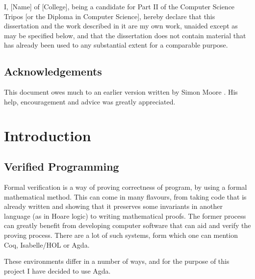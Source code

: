 \documentclass[12pt,twoside,notitlepage]{report}
\begin{document}
I, [Name] of [College], being a candidate for Part II of the Computer
Science Tripos [or the Diploma in Computer Science], hereby declare
that this dissertation and the work described in it are my own work,
unaided except as may be specified below, and that the dissertation
does not contain material that has already been used to any substantial
extent for a comparable purpose.

\bigskip
{}

\medskip
{}

\cleardoublepage

\tableofcontents

\listoffigures

\newpage
\section*{Acknowledgements}

This document owes much to an earlier version written by Simon Moore
\cite{moore95}.  His help, encouragement and advice was greatly
appreciated.


\cleardoublepage        %

\setcounter{page}{1}
\pagestyle{headings}

\chapter{Introduction}

\section{Verified Programming}

Formal verification is a way of proving correctness of program, by using a formal mathematical method. This can come in many flavours, from taking code that is already written and showing that it preserves some invariants in another language (as in Hoare logic) to writing mathematical proofs. The former process can greatly benefit from developing computer software that can aid and verify the proving process. There are a lot of such systems, form which one can mention Coq, Isabelle/HOL or Agda.

These environments differ in a number of ways, and for the purpose of this project I have decided to use Agda. 
\end{document}
